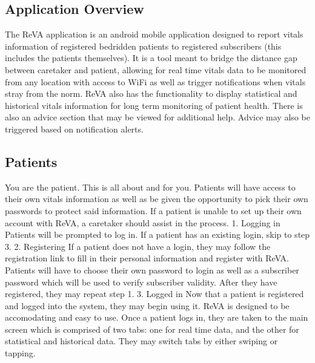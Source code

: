\subsection{Application Overview}
The ReVA application is an android mobile application designed to report vitals information of registered bedridden patients to registered subscribers (this includes the patients themselves). It is a tool meant to bridge the distance gap between caretaker and patient, allowing for real time vitals data to be monitored from any location with access to WiFi as well as trigger notifications when vitals stray from the norm. ReVA also has the functionality to display statistical and historical vitals information for long term monitoring of patient health. There is also an advice section that may be viewed for additional help. Advice may also be triggered based on notification alerts. 
\subsection{Patients}
	You are the patient. This is all about and for you. Patients will have access to their own vitals information as well as be given the opportunity to pick their own passwords to protect said information. If a patient is unable to set up their own account with ReVA, a caretaker should assist in the process. 
	1. Logging in
		Patients will be prompted to log in. If a patient has an existing login, skip to step 3. 
	2. Registering
		If a patient does not have a login, they may follow the registration link to fill in their personal information and 			register with ReVA. Patients will have to choose their own password to login as well as a subscriber password which will 		 be used to verify subscriber validity. After they have registered, they may repeat step 1. 
	3. Logged in
		Now that a patient is registered and logged into the system, they may begin using it. 
	ReVA is designed to be accomodating and easy to use. Once a patient logs in, they are taken to the main screen which is comprised of two tabs: one for real time data, and the other for statistical and historical data. They may switch tabs by either swiping or tapping.
	
